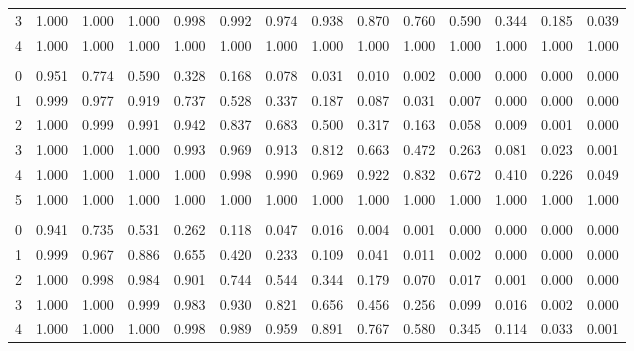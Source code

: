 \documentclass[
]{article}
\begin{document}
\begin{longtable}[t]{lrrrrrrrrrrrrr}
\hspace{1em}3 & 1.000 & 1.000 & 1.000 & 0.998 & 0.992 & 0.974 & 0.938 & 0.870 & 0.760 & 0.590 & 0.344 & 0.185 & 0.039\\
\hspace{1em}4 & 1.000 & 1.000 & 1.000 & 1.000 & 1.000 & 1.000 & 1.000 & 1.000 & 1.000 & 1.000 & 1.000 & 1.000 & 1.000\\
\addlinespace[0.3em]
\multicolumn{14}{l}{$n=5$}\\
\hspace{1em}0 & 0.951 & 0.774 & 0.590 & 0.328 & 0.168 & 0.078 & 0.031 & 0.010 & 0.002 & 0.000 & 0.000 & 0.000 & 0.000\\
\hspace{1em}1 & 0.999 & 0.977 & 0.919 & 0.737 & 0.528 & 0.337 & 0.187 & 0.087 & 0.031 & 0.007 & 0.000 & 0.000 & 0.000\\
\hspace{1em}2 & 1.000 & 0.999 & 0.991 & 0.942 & 0.837 & 0.683 & 0.500 & 0.317 & 0.163 & 0.058 & 0.009 & 0.001 & 0.000\\
\hspace{1em}3 & 1.000 & 1.000 & 1.000 & 0.993 & 0.969 & 0.913 & 0.812 & 0.663 & 0.472 & 0.263 & 0.081 & 0.023 & 0.001\\
\hspace{1em}4 & 1.000 & 1.000 & 1.000 & 1.000 & 0.998 & 0.990 & 0.969 & 0.922 & 0.832 & 0.672 & 0.410 & 0.226 & 0.049\\
\hspace{1em}5 & 1.000 & 1.000 & 1.000 & 1.000 & 1.000 & 1.000 & 1.000 & 1.000 & 1.000 & 1.000 & 1.000 & 1.000 & 1.000\\
\addlinespace[0.3em]
\multicolumn{14}{l}{$n=6$}\\
\hspace{1em}0 & 0.941 & 0.735 & 0.531 & 0.262 & 0.118 & 0.047 & 0.016 & 0.004 & 0.001 & 0.000 & 0.000 & 0.000 & 0.000\\
\hspace{1em}1 & 0.999 & 0.967 & 0.886 & 0.655 & 0.420 & 0.233 & 0.109 & 0.041 & 0.011 & 0.002 & 0.000 & 0.000 & 0.000\\
\hspace{1em}2 & 1.000 & 0.998 & 0.984 & 0.901 & 0.744 & 0.544 & 0.344 & 0.179 & 0.070 & 0.017 & 0.001 & 0.000 & 0.000\\
\hspace{1em}3 & 1.000 & 1.000 & 0.999 & 0.983 & 0.930 & 0.821 & 0.656 & 0.456 & 0.256 & 0.099 & 0.016 & 0.002 & 0.000\\
\hspace{1em}4 & 1.000 & 1.000 & 1.000 & 0.998 & 0.989 & 0.959 & 0.891 & 0.767 & 0.580 & 0.345 & 0.114 & 0.033 & 0.001\\

\end{longtable}
\end{document}
